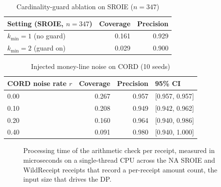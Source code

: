 \documentclass[conference]{IEEEtran}
\newcommand{\latMedian}{NA}
\newcommand{\latPNineNine}{NA}
\newcommand{\latMax}{NA}
\newcommand{\latN}{NA}
\newcommand{\latUnit}{\ensuremath{\mu}s}
\begin{document}
\begin{table}[b]
\centering\small
\caption{Cardinality-guard ablation on SROIE ($n{=}347$)}
\label{tab:guard}
\begin{tabular}{lrr}
\toprule
Setting (SROIE, $n{=}347$) & Coverage & Precision \\
\midrule
$k_{\min}{=}1$ (no guard)  & 0.161 & 0.929 \\
$k_{\min}{=}2$ (guard on)  & 0.029 & 0.900 \\
\bottomrule
\end{tabular}
\end{table}

\begin{table}[b]
\centering\small
\caption{Injected money-line noise on CORD (10 seeds)}
\label{tab:robust}
\begin{tabular}{lrrl}
\toprule
CORD noise rate $r$ & Coverage & Precision & 95\% CI \\
\midrule
0.00 & 0.267 & 0.957 & [0.957, 0.957] \\
0.10 & 0.208 & 0.949 & [0.942, 0.962] \\
0.20 & 0.160 & 0.964 & [0.940, 0.986] \\
0.40 & 0.091 & 0.980 & [0.940, 1.000] \\
\bottomrule
\end{tabular}
\end{table}

\begin{figure}[b]
\centering
{}
\caption{Processing time of the arithmetic check per receipt, measured in
microseconds on a single-thread CPU across the \latN{} SROIE and WildReceipt
receipts that record a per-receipt amount count, the input size that drives
the DP.}
\label{fig:latency}
\end{figure}
\end{document}
